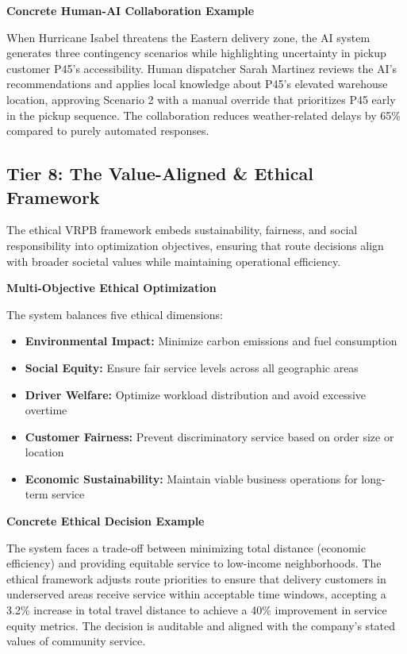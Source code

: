 \documentclass{article}
\begin{document}
\textbf{Concrete Human-AI Collaboration Example}

When Hurricane Isabel threatens the Eastern delivery zone, the AI system generates three contingency scenarios while highlighting uncertainty in pickup customer P45's accessibility. Human dispatcher Sarah Martinez reviews the AI's recommendations and applies local knowledge about P45's elevated warehouse location, approving Scenario 2 with a manual override that prioritizes P45 early in the pickup sequence. The collaboration reduces weather-related delays by 65\% compared to purely automated responses.

\subsection{Tier 8: The Value-Aligned \& Ethical Framework}

The ethical VRPB framework embeds sustainability, fairness, and social responsibility into optimization objectives, ensuring that route decisions align with broader societal values while maintaining operational efficiency.

\textbf{Multi-Objective Ethical Optimization}

The system balances five ethical dimensions:
\begin{itemize}
\item \textbf{Environmental Impact:} Minimize carbon emissions and fuel consumption
\item \textbf{Social Equity:} Ensure fair service levels across all geographic areas
\item \textbf{Driver Welfare:} Optimize workload distribution and avoid excessive overtime
\item \textbf{Customer Fairness:} Prevent discriminatory service based on order size or location
\item \textbf{Economic Sustainability:} Maintain viable business operations for long-term service
\end{itemize}

\textbf{Concrete Ethical Decision Example}

The system faces a trade-off between minimizing total distance (economic efficiency) and providing equitable service to low-income neighborhoods. The ethical framework adjusts route priorities to ensure that delivery customers in underserved areas receive service within acceptable time windows, accepting a 3.2\% increase in total travel distance to achieve a 40\% improvement in service equity metrics. The decision is auditable and aligned with the company's stated values of community service.
\end{document}
